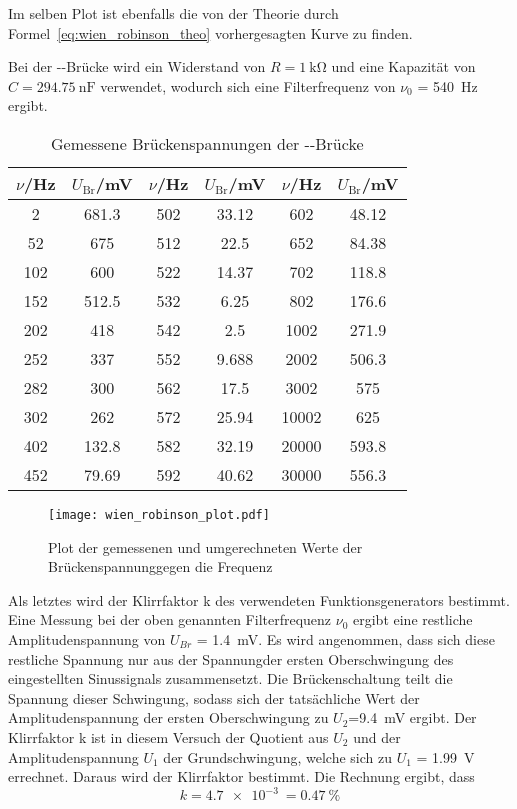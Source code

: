 Im selben Plot ist ebenfalls die von der Theorie durch
Formel~\eqref{eq:wien_robinson_theo} vorhergesagten Kurve zu finden.

Bei der --Brücke wird ein Widerstand von
$R=\SI{1}{\kilo\ohm}$ und eine Kapazität von
$C=\SI{294.75}{\nano\farad}$
verwendet, wodurch sich eine Filterfrequenz von $\nu_0$ =
\SI{540}{\hertz} ergibt.
%
\begin{table}[]
  \centering
  \begin{tabular}{SS|SS|SS}
     \toprule
{$\nu$/}\si{\hertz}&{$U_\text{Br}$/}\si{\milli\volt}&{$\nu$/}\si{\hertz}&
{$U_\text{Br}$/}\si{\milli\volt}&{$\nu$/}\si{\hertz}&
{$U_\text{Br}$/}\si{\milli\volt}\\
&681.3&502&33.12&602&48.12\\
52&675&512&22.5&652&84.38\\
102	&600&522	&14.37&702&118.8\\
152&512.5&532&6.25&802&176.6\\
202&418&542&2.5&1002&271.9\\
252&337&552&9.688&2002&506.3\\
282&300&562&17.5&3002&575\\
302&262&572&25.94&10002&625\\
402	&132.8&582&32.19&20000&593.8\\
452&79.69&592&40.62&30000&556.3\\
    \bottomrule
  \end{tabular}
\caption{Gemessene Brückenspannungen der
--Brücke}
  \label{tab:wien_robinson}
\end{table}
%
\begin{figure}
\centering
\texttt{[image: wien\_robinson\_plot.pdf]}
\caption{Plot der gemessenen und umgerechneten Werte der
Brückenspannunggegen die Frequenz}
\label{fig:wien_robinson_plot}
\end{figure}
%
Als letztes wird der Klirrfaktor k des verwendeten Funktionsgenerators
bestimmt.
Eine Messung bei der oben genannten Filterfrequenz $\nu_0$ ergibt eine
restliche Amplitudenspannung von $U_{Br}$ = \SI{1.4}{\milli\volt}. Es
wird angenommen, dass sich diese restliche Spannung nur aus der
Spannungder ersten Oberschwingung des eingestellten Sinussignals
zusammensetzt.
Die Brückenschaltung teilt die Spannung dieser Schwingung, sodass sich
der tatsächliche Wert der Amplitudenspannung der ersten Oberschwingung
zu $U_2$=\SI{9.4}{\milli\volt} ergibt.
Der Klirrfaktor k ist in diesem Versuch der Quotient aus $U_2$ und der
Amplitudenspannung $U_1$ der Grundschwingung, welche sich zu $U_1$ =
\SI{1.99}{\volt} errechnet.
Daraus wird der Klirrfaktor bestimmt. Die Rechnung ergibt, dass
%
\begin{equation*}
k = \SI{4.7e-3}{} = \SI{0.47}{\percent}
\end{equation*}
%
\FloatBarrier